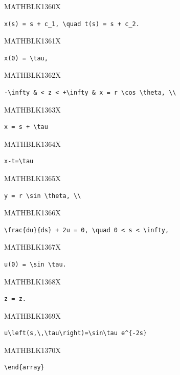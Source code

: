 \documentclass[
  ukrainian,
]{article}
\begin{document}
MATHBLK1360X

\begin{verbatim}
x(s) = s + c_1, \quad t(s) = s + c_2.
\end{verbatim}

MATHBLK1361X

\begin{verbatim}
x(0) = \tau,
\end{verbatim}

MATHBLK1362X

\begin{verbatim}
-\infty & < z < +\infty & x = r \cos \theta, \\
\end{verbatim}

MATHBLK1363X

\begin{verbatim}
x = s + \tau
\end{verbatim}

MATHBLK1364X

\begin{verbatim}
x-t=\tau
\end{verbatim}

MATHBLK1365X

\begin{verbatim}
y = r \sin \theta, \\
\end{verbatim}

MATHBLK1366X

\begin{verbatim}
\frac{du}{ds} + 2u = 0, \quad 0 < s < \infty,
\end{verbatim}

MATHBLK1367X

\begin{verbatim}
u(0) = \sin \tau.
\end{verbatim}

MATHBLK1368X

\begin{verbatim}
z = z.
\end{verbatim}

MATHBLK1369X

\begin{verbatim}
u\left(s,\,\tau\right)=\sin\tau e^{-2s}
\end{verbatim}

MATHBLK1370X

\begin{verbatim}
\end{array}
\end{verbatim}
\end{document}
